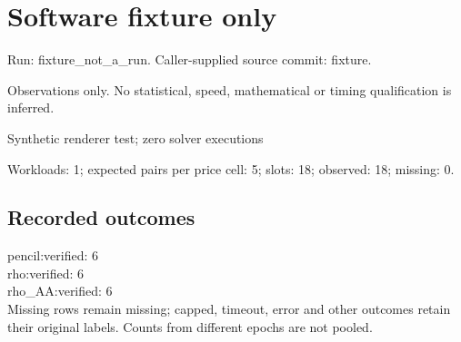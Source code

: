 \documentclass[10pt]{article}
\begin{document}
\raggedright\sloppy\section*{Software fixture only}
Run: fixture\_not\_a\_run. Caller-supplied source commit: fixture.\par
Observations only. No statistical, speed, mathematical or timing qualification is inferred.\par
Synthetic renderer test; zero solver executions\par Workloads: 1; expected pairs per price cell: 5; slots: 18; observed: 18; missing: 0.\par
\subsection*{Recorded outcomes}
pencil:verified: 6\\
rho:verified: 6\\
rho\_AA:verified: 6\\
 Missing rows remain missing; capped, timeout, error and other outcomes retain their original labels. Counts from different epochs are not pooled.\par
\end{document}

